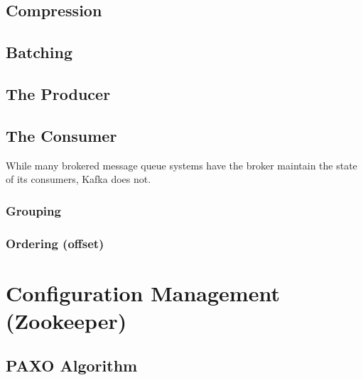 \subsection{Compression}

\subsection{Batching}

\subsection{The Producer}

\subsection{The Consumer}
While many brokered message queue systems have the broker maintain the state of
its consumers, Kafka does not.

\subsubsection{Grouping}

\subsubsection{Ordering (offset)}

\section{Configuration Management (Zookeeper)}
\subsection{PAXO Algorithm}
